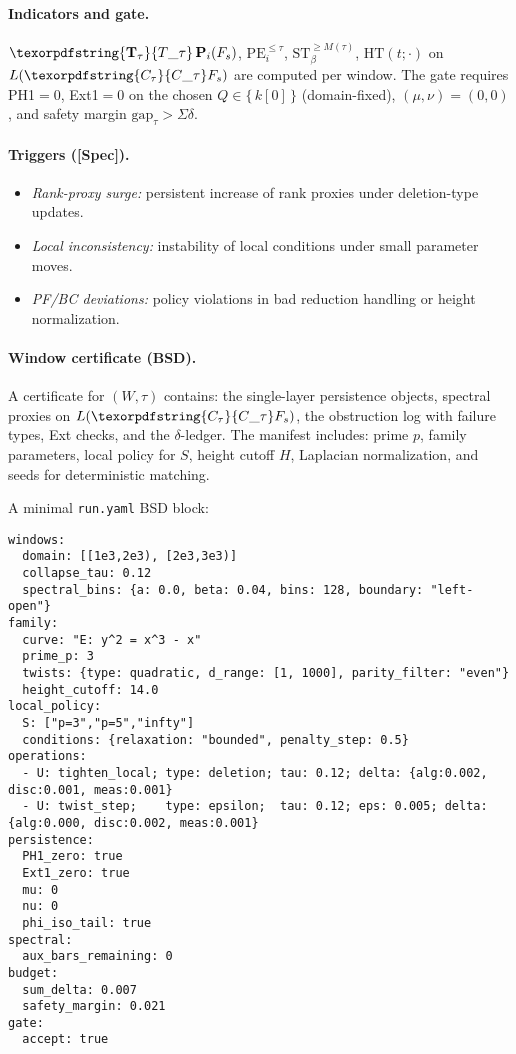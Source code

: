 \documentclass[11pt]{article}
\numberwithin{equation}{section}
\theoremstyle{plain}
\theoremstyle{definition}
\theoremstyle{remark}
\DeclareRobustCommand{\hyp}{\nobreakdash-}
\theoremstyle{plain}
\theoremstyle{definition}
\numberwithin{equation}{section}
\theoremstyle{definition}
\DeclareRobustCommand{\Ttau}{\texorpdfstring{\ensuremath{\mathbf{T}_{\tau}}}{T\_\tau}}
\DeclareRobustCommand{\Ctau}{\texorpdfstring{\ensuremath{C_{\tau}}}{C\_\tau}}
\DeclareRobustCommand{\Qtest}{\{\,k[0]\,\}}
\numberwithin{equation}{section}
\theoremstyle{plain}
\theoremstyle{definition}
\theoremstyle{remark}
\providecommand{\Cfun}[1]{\mathsf{C}_{#1}}
\providecommand{\Tfun}[1]{\mathbf{T}_{#1}}
\providecommand{\Ctau}{\Cfun{\tau}}
\providecommand{\Ttau}{\Tfun{\tau}}
\begin{document}
\paragraph{Indicators and gate.}
\(\Ttau\,\mathbf{P}_i(F_s)\), \(\mathrm{PE}_i^{\le\tau}\), \(\mathrm{ST}_\beta^{\ge M(\tau)}\), \(\mathrm{HT}(t;\cdot)\) on \(L(\Ctau F_s)\) are computed per window.
The gate requires PH1\(=0\), Ext1\(=0\) on the chosen \(Q\in\Qtest\) (domain\hyp fixed), \((\mu,\nu)=(0,0)\), and safety margin \(\mathrm{gap}_\tau>\Sigma\delta\).

\paragraph{Triggers ([Spec]).}
\begin{itemize}
  \item \emph{Rank\hyp proxy surge:} persistent increase of rank proxies under deletion\hyp type updates.
  \item \emph{Local inconsistency:} instability of local conditions under small parameter moves.
  \item \emph{PF/BC deviations:} policy violations in bad reduction handling or height normalization.
\end{itemize}

\paragraph{Window certificate (BSD).}
A certificate for \((W,\tau)\) contains: the single\hyp layer persistence objects, spectral proxies on \(L(\Ctau F_s)\), the obstruction log with failure types, Ext checks, and the \(\delta\)\hyp ledger. The manifest includes: prime \(p\), family parameters, local policy for \(S\), height cutoff \(H\), Laplacian normalization, and seeds for deterministic matching.

\noindent A minimal \texttt{run.yaml} BSD block:

\begin{verbatim}
windows:
  domain: [[1e3,2e3), [2e3,3e3)]
  collapse_tau: 0.12
  spectral_bins: {a: 0.0, beta: 0.04, bins: 128, boundary: "left-open"}
family:
  curve: "E: y^2 = x^3 - x"
  prime_p: 3
  twists: {type: quadratic, d_range: [1, 1000], parity_filter: "even"}
  height_cutoff: 14.0
local_policy:
  S: ["p=3","p=5","infty"]
  conditions: {relaxation: "bounded", penalty_step: 0.5}
operations:
  - U: tighten_local; type: deletion; tau: 0.12; delta: {alg:0.002, disc:0.001, meas:0.001}
  - U: twist_step;    type: epsilon;  tau: 0.12; eps: 0.005; delta: {alg:0.000, disc:0.002, meas:0.001}
persistence:
  PH1_zero: true
  Ext1_zero: true
  mu: 0
  nu: 0
  phi_iso_tail: true
spectral:
  aux_bars_remaining: 0
budget:
  sum_delta: 0.007
  safety_margin: 0.021
gate:
  accept: true
\end{verbatim}
\end{document}
